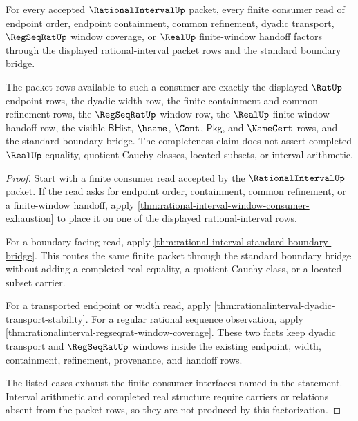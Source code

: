 \begin{theorem}
\label{thm:rationalinterval-finite-consumer-completeness}
For every accepted $\RationalIntervalUp$ packet, every finite consumer read of
endpoint order, endpoint containment, common refinement, dyadic transport,
$\RegSeqRatUp$ window coverage, or $\RealUp$ finite-window handoff factors
through the displayed rational-interval packet rows and the standard boundary
bridge.

The packet rows available to such a consumer are exactly the displayed
$\RatUp$ endpoint rows, the dyadic-width row, the finite containment and common
refinement rows, the $\RegSeqRatUp$ window row, the $\RealUp$ finite-window
handoff row, the visible $\mathsf{BHist}$, $\hsame$, $\Cont$, $\mathsf{Pkg}$,
and $\NameCert$ rows, and the standard boundary bridge. The completeness claim
does not assert completed $\RealUp$ equality, quotient Cauchy classes, located
subsets, or interval arithmetic.
\end{theorem}
\begin{proof}
Start with a finite consumer read accepted by the $\RationalIntervalUp$ packet.
If the read asks for endpoint order, containment, common refinement, or a
finite-window handoff, apply
\autoref{thm:rational-interval-window-consumer-exhaustion} to place it on one
of the displayed rational-interval rows.

For a boundary-facing read, apply
\autoref{thm:rational-interval-standard-boundary-bridge}. This routes the same
finite packet through the standard boundary bridge without adding a completed
real equality, a quotient Cauchy class, or a located-subset carrier.

For a transported endpoint or width read, apply
\autoref{thm:rationalinterval-dyadic-transport-stability}. For a regular
rational sequence observation, apply
\autoref{thm:rationalinterval-regseqrat-window-coverage}. These two facts keep
dyadic transport and $\RegSeqRatUp$ windows inside the existing endpoint,
width, containment, refinement, provenance, and handoff rows.

The listed cases exhaust the finite consumer interfaces named in the
statement. Interval arithmetic and completed real structure require carriers or
relations absent from the packet rows, so they are not produced by this
factorization.
\end{proof}

